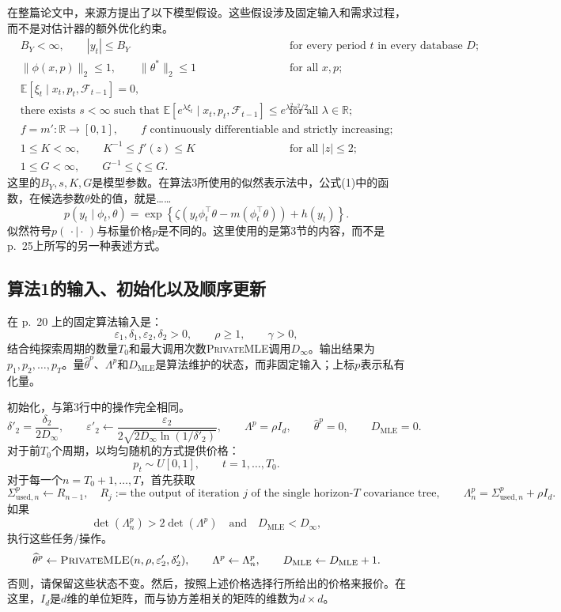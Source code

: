 \documentclass{article}
\begin{document}
在整篇论文中，来源方提出了以下模型假设。这些假设涉及固定输入和需求过程，而不是对估计器的额外优化约束。
\begin{align*}
& B_Y<\infty,\qquad |y_t|\le B_Y
&&\text{for every period }t\text{ in every database }D;\\
&\|\phi(x,p)\|_2\le1,\qquad \|\theta^*\|_2\le1
&&\text{for all }x,p;\\
&\mathbb E[\xi_t\mid x_t,p_t,\mathcal F_{t-1}]=0,\\
&\text{there exists }s<\infty\text{ such that }
\mathbb E[e^{\lambda\xi_t}\mid x_t,p_t,\mathcal F_{t-1}]
\le e^{\lambda^2s^2/2}
&&\text{for all }\lambda\in\mathbb R;\\
&f=m':\mathbb R\longrightarrow[0,1],
\qquad f\text{ continuously differentiable and strictly increasing};\\
&1\le K<\infty,\qquad K^{-1}\le f'(z)\le K
&&\text{for all }|z|\le2;\\
&1\le G<\infty,\qquad G^{-1}\le\zeta\le G.
\end{align*}
这里的$B_Y,s,K,G$是模型参数。在算法3所使用的似然表示法中，公式(1)中的函数，在候选参数$\theta$处的值，就是……
\[
p(y_t\mid\phi_t,\theta)
=\exp\!\left\{\zeta\left(y_t\phi_t^{\top}\theta
-m(\phi_t^{\top}\theta)\right)+h(y_t)\right\}.
\]
似然符号$p(\,\cdot\mid\cdot\,)$与标量价格$p$是不同的。这里使用的是第3节的内容，而不是p.~25上所写的另一种表述方式。

\subsection*{算法1的输入、初始化以及顺序更新}
在 p.~20 上的固定算法输入是：
\[
\varepsilon_1,\delta_1,\varepsilon_2,\delta_2>0,
\qquad \rho\ge1,\qquad \gamma>0,
\]
结合纯探索周期的数量$T_0$和最大调用次数\textsc{PrivateMLE}调用$D_\infty$。输出结果为$p_1,p_2,\ldots,p_T$。量$\widehat\theta^p$、$\Lambda^p$和$D_{\mathrm{MLE}}$是算法维护的状态，而非固定输入；上标$p$表示私有化量。

初始化，与第3行中的操作完全相同。
\[
\delta'_2=\frac{\delta_2}{2D_\infty},
\qquad
\varepsilon'_2\leftarrow
\frac{\varepsilon_2}{2\sqrt{2D_\infty\ln(1/\delta'_2)}},
\qquad
\Lambda^p=\rho I_d,
\qquad \widehat\theta^p=0,
\qquad D_{\mathrm{MLE}}=0.
\]
对于前$T_0$个周期，以均匀随机的方式提供价格：
\[
p_t\sim U[0,1],\qquad t=1,\ldots,T_0.
\]
对于每一个$n=T_0+1,\ldots,T$，首先获取
\[
\Sigma^p_{\mathrm{used},n}\leftarrow R_{n-1},\quad R_j:=\text{the output of iteration }j\text{ of the single horizon-}T\text{ covariance tree},
\qquad \Lambda_n^p=\Sigma^p_{\mathrm{used},n}+\rho I_d.
\]
如果
\[
\det(\Lambda_n^p)>2\det(\Lambda^p)
\quad\text{and}\quad D_{\mathrm{MLE}}<D_\infty,
\]
执行这些任务/操作。
\[
\widehat\theta^p\leftarrow
\textsc{PrivateMLE}(n,\rho,\varepsilon'_2,\delta'_2),
\qquad \Lambda^p\leftarrow\Lambda_n^p,
\qquad D_{\mathrm{MLE}}\leftarrow D_{\mathrm{MLE}}+1.
\]
否则，请保留这些状态不变。然后，按照上述价格选择行所给出的价格来报价。在这里，$I_d$是$d$维的单位矩阵，而与协方差相关的矩阵的维数为$d\times d$。
\end{document}
